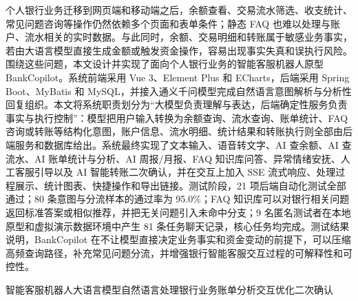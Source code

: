 \documentclass[bachelor, print]{xduthesis}
\begin{document}
\frontmatter


\begin{cabstract}
个人银行业务迁移到网页端和移动端之后，余额查看、交易流水筛选、收支统计、常见问题咨询等操作仍然依赖多个页面和表单条件；静态 FAQ 也难以处理与账户、流水相关的实时数据。与此同时，余额、交易明细和转账属于敏感业务事实，若由大语言模型直接生成金额或触发资金操作，容易出现事实失真和误执行风险。围绕这些问题，本文设计并实现了面向个人银行业务的智能客服机器人原型 BankCopilot。系统前端采用 Vue 3、Element Plus 和 ECharts，后端采用 Spring Boot、MyBatis 和 MySQL，并接入通义千问模型完成自然语言意图解析与分析性回复组织。本文将系统职责划分为“大模型负责理解与表达，后端确定性服务负责事实与执行控制”：模型把用户输入转换为余额查询、流水查询、账单统计、FAQ 咨询或转账等结构化意图，账户信息、流水明细、统计结果和转账执行则全部由后端服务和数据库给出。系统最终实现了文本输入、语音转文字、AI 查余额、AI 查流水、AI 账单统计与分析、AI 周报/月报、FAQ 知识库问答、异常情绪安抚、人工客服引导以及 AI 智能转账二次确认，并在交互上加入 SSE 流式响应、处理过程展示、统计图表、快捷操作和导出链接。测试阶段，21 项后端自动化测试全部通过；80 条意图与分流样本的通过率为 95.0\%；FAQ 知识库可以对银行相关问题返回标准答案或相似推荐，并把无关问题引入未命中分支；9 名匿名测试者在本地原型和虚拟演示数据环境中产生 81 条任务聊天记录，核心任务均完成。测试结果说明，BankCopilot 在不让模型直接决定业务事实和资金变动的前提下，可以压缩高频查询路径，补充常见问题分流，并增强银行智能客服交互过程的可解释性和可控性。
\end{cabstract}

\begin{ckeywords}
智能客服机器人\quad 大语言模型\quad 自然语言处理\quad 银行业务\quad 账单分析\quad 交互优化\quad 二次确认
\end{ckeywords}
\end{document}
